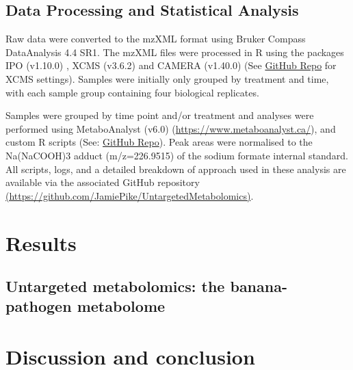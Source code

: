 \subsection{Data Processing and Statistical Analysis}
Raw data were converted to the mzXML format using Bruker Compass DataAnalysis 4.4 SR1. The mzXML files were processed in R using the packages IPO (v1.10.0) \parencite{Libiseller2015}, XCMS (v3.6.2) \parencite{Benton2010} and CAMERA (v1.40.0) \parencite{Kuhl2012}   (See \href{https://github.com/JamiePike/UntargetedMetabolomics/tree/main/NovDec22/XCMS}{GitHub Repo} for XCMS settings). Samples were initially only grouped by treatment and time, with each sample group containing four biological replicates. 

Samples were grouped by time point and/or treatment and analyses were performed using MetaboAnalyst (v6.0) (\href{https://www.metaboanalyst.ca/}{https://www.metaboanalyst.ca/}), and custom R scripts (See: \href{https://github.com/JamiePike/UntargetedMetabolomics/tree/main}{GitHub Repo}). Peak areas were normalised to the Na(NaCOOH)3 adduct (m/z=226.9515) of the sodium formate internal standard. All scripts, logs, and a detailed breakdown of approach used in these analysis are available via the associated GitHub repository \href{https://github.com/JamiePike/UntargetedMetabolomics}{ (https://github.com/JamiePike/UntargetedMetabolomics)}. 

\newpage
\section{Results}
\subsection{Untargeted metabolomics: the banana-pathogen metabolome}




\newpage
\section{Discussion and conclusion}
